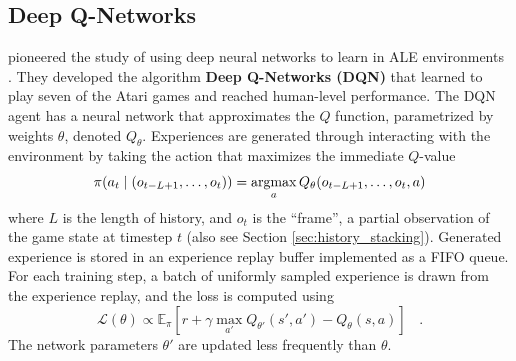 \subsection{Deep Q-Networks} \label{sec:dqn}
\citeauthor{PlayingAtariDeep_Mnih.Kavukcuoglu.ea_2013} pioneered the study of using deep neural networks to learn in ALE environments \cite{PlayingAtariDeep_Mnih.Kavukcuoglu.ea_2013}.
They developed the algorithm \textbf{Deep Q-Networks (DQN)} that learned to play seven of the Atari games and reached human-level performance.
The DQN agent has a neural network that approximates the $Q$ function, parametrized by weights $\theta$, denoted $Q_\theta$.
Experiences are generated through interacting with the environment by taking the action that maximizes the immediate $Q$-value
\begin{align*}
    \pi(a_t \mid (o_{t - L + 1}, \dots, o_t)) = \operatorname*{argmax}_{a}{Q_{\theta}(o_{t - L + 1}, \dots, o_t, a)}
\end{align*}
where $L$ is the length of history, and $o_t$ is the ``frame'', a partial observation of the game state at timestep $t$ (also see Section \ref{sec:history_stacking}).
Generated experience is stored in an experience replay buffer implemented as a FIFO queue.
For each training step, a batch of uniformly sampled experience is drawn from the experience replay, and the loss is computed using
\begin{equation*}
    \mathcal{L}(\theta) \propto \mathbb{E}_\pi\left[r + \gamma \max _{a'} Q_{\theta'}(s', a') - Q_{\theta}(s, a) \right] ~~~~ .
\end{equation*}
The network parameters $\theta'$ are updated less frequently than $\theta$.

